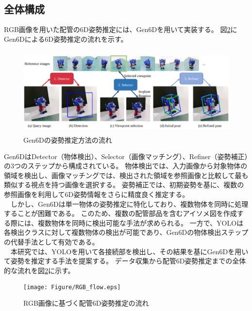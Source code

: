 \subsection{全体構成}
RGB画像を用いた配管の6D姿勢推定には、Gen6Dを用いて実装する。
図\ref{fig:f2}にGen6Dによる6D姿勢推定の流れを示す。
\begin{figure}[htbt]
	\centering
	 \includegraphics[height=45mm]{Figure/Gen6D.eps}
	 \caption{Gen6Dの姿勢推定方法の流れ}
	 \label{fig:f2}
\end{figure}

Gen6DはDetector（物体検出）、Selector（画像マッチング）、Refiner（姿勢補正）の3つのステップから構成されている。
物体検出では、入力画像から対象物体の領域を検出し、画像マッチングでは、検出された領域を参照画像と比較して最も類似する視点を持つ画像を選択する。
姿勢補正では、初期姿勢を基に、複数の参照画像を利用して6D姿勢情報をさらに精度良く推定する。\\
　しかし、Gen6Dは単一物体の姿勢推定に特化しており、複数物体を同時に処理することが困難である。
このため、複数の配管部品を含むアイソメ図を作成する際には、複数物体を同時に検出可能な手法が求められる。
一方で、YOLOは各検出クラスに対して複数物体の検出が可能であり、Gen6Dの物体検出ステップの代替手法として有効である。\\
　本研究では、YOLOを用いて各接続部を検出し、その結果を基にGen6Dを用いて姿勢を推定する手法を提案する。
データ収集から配管6D姿勢推定までの全体的な流れを図\ref{fig:f2}に示す。
\begin{figure}[htbt]
	\centering
	 \texttt{[image: Figure/RGB\_flow.eps]}
	 \caption{RGB画像に基づく配管6D姿勢推定の流れ}
	 \label{fig:f2}
\end{figure}


